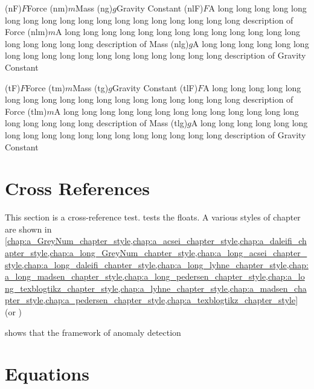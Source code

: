 \documentclass[10pt,a4paper,extrafontsizes,oldfontcommands,oneside]{memoir}
\begin{document}
\glossary(nF){$F$}{Force}
\glossary(nm){$m$}{Mass}
\glossary(ng){$g$}{Gravity Constant}
\glossary(nlF){$F$}{A long long long long long long long long long long long long long long long long long long description of Force}
\glossary(nlm){$m$}{A long long long long long long long long long long long long long long long long long long description of Mass}
\glossary(nlg){$g$}{A long long long long long long long long long long long long long long long long long long description of Gravity Constant}

\glossary(tF){$F$}{Force}
\glossary(tm){$m$}{Mass}
\glossary(tg){$g$}{Gravity Constant}
\glossary(tlF){$F$}{A long long long long long long long long long long long long long long long long long long description of Force}
\glossary(tlm){$m$}{A long long long long long long long long long long long long long long long long long long description of Mass}
\glossary(tlg){$g$}{A long long long long long long long long long long long long long long long long long long description of Gravity Constant}


\section{Cross References} %
\label{sec:cross_references}

This section is a cross-reference test.  tests the floats. A various styles of chapter are shown in \cref{chap:a_GreyNum_chapter_style,chap:a_acsei_chapter_style,chap:a_daleifi_chapter_style,chap:a_long_GreyNum_chapter_style,chap:a_long_acsei_chapter_style,chap:a_long_daleifi_chapter_style,chap:a_long_lyhne_chapter_style,chap:a_long_madsen_chapter_style,chap:a_long_pedersen_chapter_style,chap:a_long_texblogtikz_chapter_style,chap:a_lyhne_chapter_style,chap:a_madsen_chapter_style,chap:a_pedersen_chapter_style,chap:a_texblogtikz_chapter_style} (or )

 shows that the framework of anomaly detection


\clearpage
\section{Equations}
\end{document}
